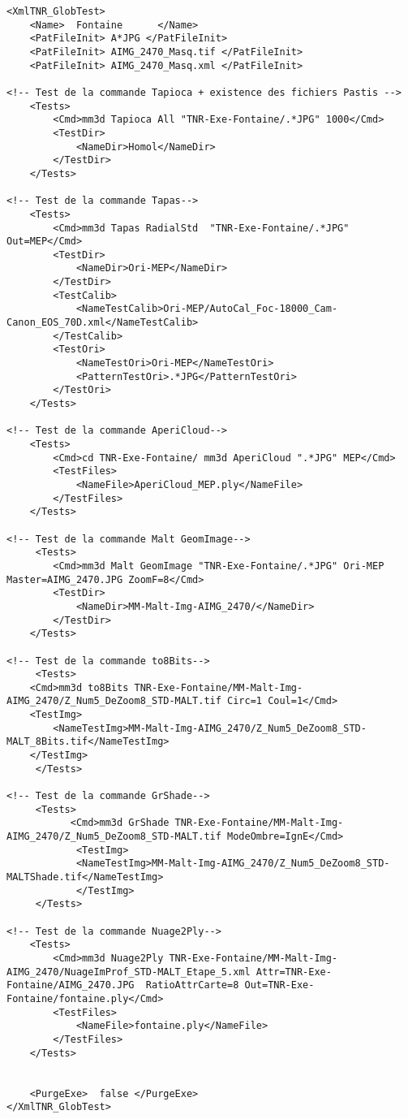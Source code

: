 \documentclass[a4paper]{book}
\begin{document}
\begin{lstlisting}
<XmlTNR_GlobTest>
	<Name>  Fontaine      </Name>  
	<PatFileInit> A*JPG </PatFileInit>
	<PatFileInit> AIMG_2470_Masq.tif </PatFileInit>
	<PatFileInit> AIMG_2470_Masq.xml </PatFileInit>
     
<!-- Test de la commande Tapioca + existence des fichiers Pastis -->
	<Tests>
		<Cmd>mm3d Tapioca All "TNR-Exe-Fontaine/.*JPG" 1000</Cmd>
		<TestDir>
			<NameDir>Homol</NameDir>
		</TestDir>
	</Tests>
     
<!-- Test de la commande Tapas-->
	<Tests>
		<Cmd>mm3d Tapas RadialStd  "TNR-Exe-Fontaine/.*JPG" Out=MEP</Cmd>
		<TestDir>
			<NameDir>Ori-MEP</NameDir>
		</TestDir>
		<TestCalib>
			<NameTestCalib>Ori-MEP/AutoCal_Foc-18000_Cam-Canon_EOS_70D.xml</NameTestCalib>
		</TestCalib>
		<TestOri>
			<NameTestOri>Ori-MEP</NameTestOri>
			<PatternTestOri>.*JPG</PatternTestOri>
		</TestOri>
	</Tests> 

<!-- Test de la commande AperiCloud-->
	<Tests>
		<Cmd>cd TNR-Exe-Fontaine/ mm3d AperiCloud ".*JPG" MEP</Cmd>
		<TestFiles>
			<NameFile>AperiCloud_MEP.ply</NameFile>
		</TestFiles>
	</Tests>
     
<!-- Test de la commande Malt GeomImage-->
	 <Tests>
		<Cmd>mm3d Malt GeomImage "TNR-Exe-Fontaine/.*JPG" Ori-MEP Master=AIMG_2470.JPG ZoomF=8</Cmd>
		<TestDir>
			<NameDir>MM-Malt-Img-AIMG_2470/</NameDir>
		</TestDir>
	</Tests>
     
<!-- Test de la commande to8Bits-->
     <Tests>
	<Cmd>mm3d to8Bits TNR-Exe-Fontaine/MM-Malt-Img-AIMG_2470/Z_Num5_DeZoom8_STD-MALT.tif Circ=1 Coul=1</Cmd>
	<TestImg>
		<NameTestImg>MM-Malt-Img-AIMG_2470/Z_Num5_DeZoom8_STD-MALT_8Bits.tif</NameTestImg>
	</TestImg>
     </Tests>

<!-- Test de la commande GrShade-->
     <Tests>
           <Cmd>mm3d GrShade TNR-Exe-Fontaine/MM-Malt-Img-AIMG_2470/Z_Num5_DeZoom8_STD-MALT.tif ModeOmbre=IgnE</Cmd>
     		<TestImg>
			<NameTestImg>MM-Malt-Img-AIMG_2470/Z_Num5_DeZoom8_STD-MALTShade.tif</NameTestImg>
           	</TestImg>
     </Tests>

<!-- Test de la commande Nuage2Ply-->  
	<Tests>
		<Cmd>mm3d Nuage2Ply TNR-Exe-Fontaine/MM-Malt-Img-AIMG_2470/NuageImProf_STD-MALT_Etape_5.xml Attr=TNR-Exe-Fontaine/AIMG_2470.JPG  RatioAttrCarte=8 Out=TNR-Exe-Fontaine/fontaine.ply</Cmd>
		<TestFiles>
			<NameFile>fontaine.ply</NameFile>
		</TestFiles>
	</Tests>


	<PurgeExe>  false </PurgeExe>
</XmlTNR_GlobTest>
\end{lstlisting}
\end{document}
